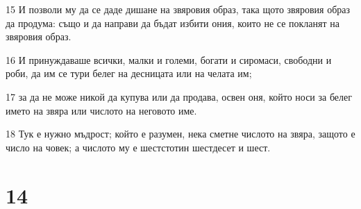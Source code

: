 \par 15 И позволи му да се даде дишане на звяровия образ, така щото звяровия образ да продума: също и да направи да бъдат избити ония, които не се покланят на звяровия образ.
\par 16 И принуждаваше всички, малки и големи, богати и сиромаси, свободни и роби, да им се тури белег на десницата или на челата им;
\par 17 за да не може никой да купува или да продава, освен оня, който носи за белег името на звяра или числото на неговото име.
\par 18 Тук е нужно мъдрост; който е разумен, нека сметне числото на звяра, защото е число на човек; а числото му е шестстотин шестдесет и шест.

\chapter{14}

